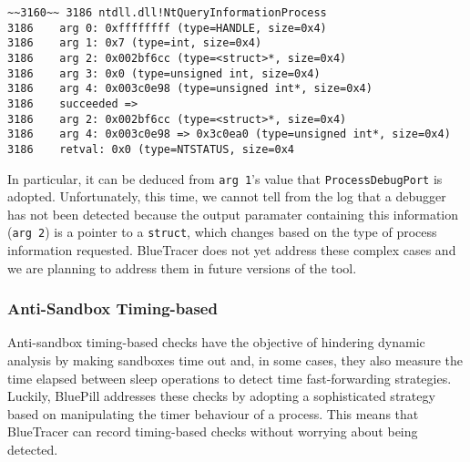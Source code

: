 \vspace{0.5cm}
\begin{lstlisting}[caption={Log entry relative to \texttt{NtQueryInformationProcess}},captionpos=b]
~~3160~~ 3186 ntdll.dll!NtQueryInformationProcess
3186 	arg 0: 0xffffffff (type=HANDLE, size=0x4)
3186 	arg 1: 0x7 (type=int, size=0x4)
3186 	arg 2: 0x002bf6cc (type=<struct>*, size=0x4)
3186 	arg 3: 0x0 (type=unsigned int, size=0x4)
3186 	arg 4: 0x003c0e98 (type=unsigned int*, size=0x4)
3186    succeeded =>
3186 	arg 2: 0x002bf6cc (type=<struct>*, size=0x4)
3186 	arg 4: 0x003c0e98 => 0x3c0ea0 (type=unsigned int*, size=0x4)
3186 	retval: 0x0 (type=NTSTATUS, size=0x4
\end{lstlisting}

In particular, it can be deduced from \texttt{arg 1}'s value that \texttt{ProcessDebugPort} is adopted. Unfortunately, this time, we cannot tell from the log that a debugger has not been detected because the output paramater containing this information (\texttt{arg 2}) is a pointer to a \texttt{struct}, which changes based on the type of process information requested. BlueTracer does not yet address these complex cases and we are planning to address them in future versions of the tool.  

\subsubsection*{Anti-Sandbox Timing-based}

Anti-sandbox timing-based checks have the objective of hindering dynamic analysis by making sandboxes time out and, in some cases, they also measure the time elapsed between sleep operations to detect time fast-forwarding strategies. Luckily, BluePill \cite{BluePill} addresses these checks by adopting a sophisticated strategy based on manipulating the timer behaviour of a process. This means that BlueTracer can record timing-based checks without worrying about being detected.

